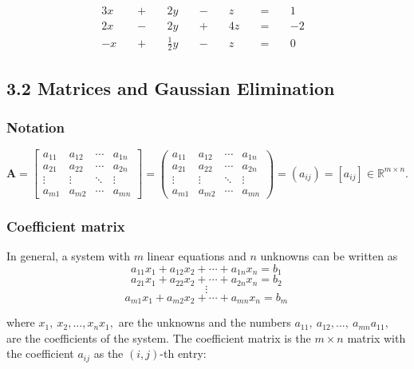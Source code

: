 \documentclass[11pt]{article}
\begin{document}
\[
{\displaystyle {\begin{alignedat}{7}3x&&\;+\;&&2y&&\;-\;&&z&&\;=\;&&1&\\2x&&\;-\;&&2y&&\;+\;&&4z&&\;=\;&&-2&\\-x&&\;+\;&&{\tfrac {1}{2}}y&&\;-\;&&z&&\;=\;&&0&\end{alignedat}}}
\]

    \hypertarget{matrices-and-gaussian-elimination}{%
\subsection{3.2 Matrices and Gaussian
Elimination}\label{matrices-and-gaussian-elimination}}

\hypertarget{notation}{%
\subsubsection{Notation}\label{notation}}

\[
{\displaystyle \mathbf {A} ={\begin{bmatrix}a_{11}&a_{12}&\cdots &a_{1n}\\a_{21}&a_{22}&\cdots &a_{2n}\\\vdots &\vdots &\ddots &\vdots \\a_{m1}&a_{m2}&\cdots &a_{mn}\end{bmatrix}}={\begin{pmatrix}a_{11}&a_{12}&\cdots &a_{1n}\\a_{21}&a_{22}&\cdots &a_{2n}\\\vdots &\vdots &\ddots &\vdots \\a_{m1}&a_{m2}&\cdots &a_{mn}\end{pmatrix}}=\left(a_{ij}\right)=\left[a_{ij}\right]\in \mathbb {R} ^{m\times n}.}
\]

\hypertarget{coefficient-matrix}{%
\subsubsection{Coefficient matrix}\label{coefficient-matrix}}

In general, a system with \(m\) linear equations and \(n\) unknowns can
be written as \[a_{11}x_1 + a_{12}x_2 + \cdots + a_{1n}x_n = b_1 \,\]
\[a_{21}x_1 + a_{22}x_2 + \cdots + a_{2n}x_n = b_2 \,\]
\[{\displaystyle \vdots \,}\]
\[a_{m1}x_1 + a_{m2}x_2 + \cdots + a_{mn}x_n = b_m \,\]

where \({\displaystyle x_{1},\ x_{2},...,x_{n}}x_{1},\) are the unknowns
and the numbers
\({\displaystyle a_{11},\ a_{12},...,\ a_{mn}}a_{{11}},\) are the
coefficients of the system. The coefficient matrix is the \(m\times n\)
matrix with the coefficient \({\displaystyle a_{ij}}\) as the
\((i,j)\)-th entry:
\end{document}
